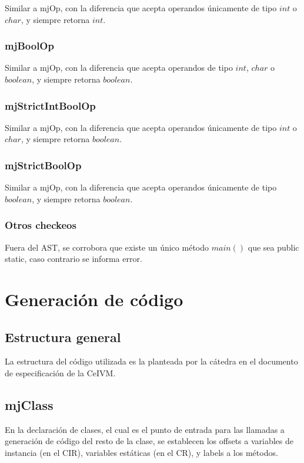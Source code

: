 \documentclass [a4paper,abstracton,titlepage]{scrartcl}
\begin{document}
Similar a mjOp, con la diferencia que acepta operandos únicamente de tipo
$int$ o $char$, y siempre retorna $int$.

  \subsubsection{mjBoolOp}

Similar a mjOp, con la diferencia que acepta operandos de tipo $int$, $char$ o
$boolean$, y siempre retorna $boolean$.

  \subsubsection{mjStrictIntBoolOp}

Similar a mjOp, con la diferencia que acepta operandos únicamente de tipo
$int$ o $char$, y siempre retorna $boolean$.

  \subsubsection{mjStrictBoolOp}

Similar a mjOp, con la diferencia que acepta operandos únicamente de tipo
$boolean$, y siempre retorna $boolean$.

  \subsubsection{Otros checkeos}

Fuera del AST, se corrobora que existe un único método $main()$ que sea public
static, caso contrario se informa error.

\section{Generación de código}

  \subsection{Estructura general}

La estructura del código utilizada es la planteada por la cátedra en el documento de especificación de la CeIVM.

  \subsection{mjClass}

En la declaración de clases, el cual es el punto de entrada para las llamadas a generación de código del resto de la clase, se establecen los offsets a variables de instancia (en el CIR), variables estáticas (en el CR), y labels a los métodos.
\end{document}
